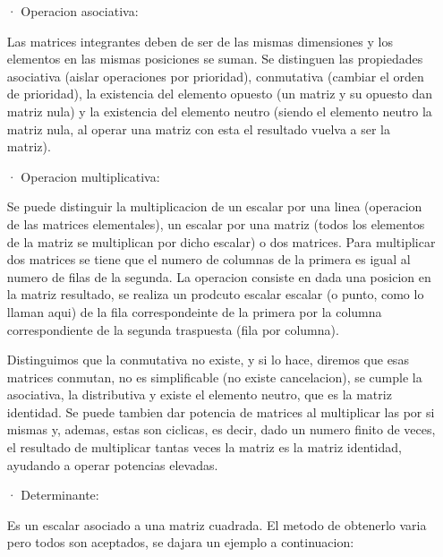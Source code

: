 \documentclass[11pt,a4paper]{article}
\begin{document}
\begin{enumerate}
\item[·] Operacion asociativa:

Las matrices integrantes deben de ser de las mismas dimensiones y los elementos en las mismas posiciones se suman. Se distinguen las propiedades asociativa (aislar operaciones por prioridad), conmutativa (cambiar el orden de prioridad), la existencia del elemento opuesto (un matriz y su opuesto dan matriz nula) y la existencia del elemento neutro (siendo el elemento neutro la matriz nula, al operar una matriz con esta el resultado vuelva a ser la matriz).

\item[·] Operacion multiplicativa: 

Se puede distinguir la multiplicacion de un escalar por una linea (operacion de las matrices elementales), un escalar por una matriz (todos los elementos de la matriz se multiplican por dicho escalar) o dos matrices. Para multiplicar dos matrices se tiene que el numero de columnas de la primera es igual al numero de filas de la segunda. La operacion consiste en dada una posicion en la matriz resultado, se realiza un prodcuto escalar escalar (o punto, como lo llaman aqui) de la fila correspondeinte de la primera por la columna correspondiente de la segunda traspuesta (fila por columna).

 Distinguimos que la conmutativa no existe, y si lo hace, diremos que esas matrices conmutan, no es simplificable (no existe cancelacion), se cumple la asociativa, la distributiva y existe el elemento neutro, que es la matriz identidad. Se puede tambien dar potencia de matrices al multiplicar las por si mismas y, ademas, estas son ciclicas, es decir, dado un numero finito de veces, el resultado de multiplicar tantas veces la matriz es la matriz identidad, ayudando a operar potencias elevadas.
 
\item[·]Determinante:

Es un escalar asociado a una matriz cuadrada. El metodo de obtenerlo varia pero todos son aceptados, se dajara un ejemplo a continuacion: 


\end{enumerate}
\end{document}
